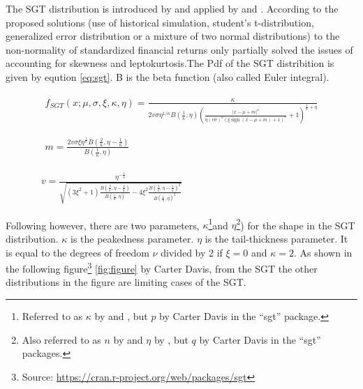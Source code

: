 \documentclass[a4paper, nobind]{templates/ociamthesis}
\begin{document}
\noindent The SGT distribution is introduced by \textcite{theodossiou1998} and applied by \textcite{bali2007} and \textcite{bali2008}. According to \textcite{bali2008} the proposed solutions (use of historical simulation, student's t-distribution, generalized error distribution or a mixture of two normal distributions) to the non-normality of standardized financial returns only partially solved the issues of accounting for skewness and leptokurtosis.The Pdf of the SGT distribition is given by eqution \eqref{eq:sgt}. B is the beta function (also called Euler integral).

\begin{equation}
\begin{array}{c}
\begin{array}{c}
f_{S G T}(x ; \mu, \sigma, \xi, \kappa, \eta)=\frac{\kappa}{2 v \sigma \eta^{1 / \kappa} B\left(\frac{1}{\kappa}, \eta\right)\left(\frac{|x-\mu +m|^{\kappa}}{\eta(v \sigma)^{\kappa}(\xi \operatorname{sign}(x-\mu + m)+1)^{\kappa}}+1\right)^{\frac{1}{\kappa}+\eta}} \\ \\ \\ 

m=\frac{2 v \sigma \xi \eta^{\frac{1}{\kappa}} B\left(\frac{2}{\kappa}, \eta-\frac{1}{\kappa}\right)}{B\left(\frac{1}{\kappa}, \eta\right)}
\end{array}
\\ \\ \\ 
v=\frac{\eta^{-\frac{1}{\kappa}}}{\sqrt{\left(3 \xi^{2}+1\right) \frac{B\left(\frac{3}{\kappa}, \eta-\frac{2}{\kappa}\right)}{B\left(\frac{1}{\kappa}, \eta\right)}-4 \xi^{2} \frac{B\left(\frac{2}{\kappa}, \eta-\frac{1}{\kappa}\right)^{2}}{B\left(\frac{1}{\kappa}, \eta\right)^{2}}}}
\end{array}
\label{eq:sgt}
\end{equation}

\noindent Following \textcite{theodossiou1998} however, there are two parameters, \(\kappa\)\footnote{Referred to as \(\kappa\) by \textcite{theodossiou1998} and \textcite{bali2008}, but \(p\) by Carter Davis in the ``sgt'' package.}and \(\eta\)\footnote{Also referred to as \(n\) by \textcite{theodossiou1998} and \(\eta\) by \textcite{bali2008}, but \(q\) by Carter Davis in the ``sgt'' packages.}) for the shape in the SGT distribution. \(\kappa\) is the peakedness parameter. \(\eta\) is the tail-thickness parameter. It is equal to the degrees of freedom \(\nu\) divided by 2 if \(\xi = 0\) and \(\kappa = 2\). As shown in the following figure\footnote{Source: \href{https://cran.r-project.org/web/packages/sgt\%22}{https://cran.r-project.org/web/packages/sgt}} \ref{fig:figure} by Carter Davis, from the SGT the other distributions in the figure are limiting cases of the SGT.
\end{document}
